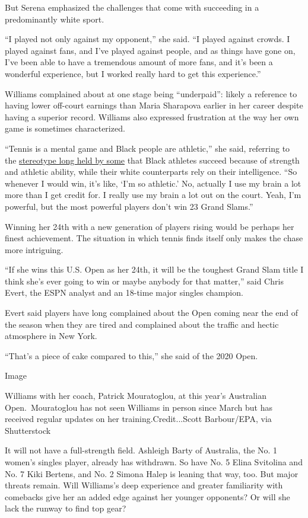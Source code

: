 But Serena emphasized the challenges that come with succeeding in a
predominantly white sport.

``I played not only against my opponent,'' she said. ``I played against
crowds. I played against fans, and I've played against people, and as
things have gone on, I've been able to have a tremendous amount of more
fans, and it's been a wonderful experience, but I worked really hard to
get this experience.''

Williams complained about at one stage being ``underpaid'': likely a
reference to having lower off-court earnings than Maria Sharapova
earlier in her career despite having a superior record. Williams also
expressed frustration at the way her own game is sometimes
characterized.

``Tennis is a mental game and Black people are athletic,'' she said,
referring to the
\href{https://www.nytimes.com/2020/06/30/sports/soccer/soccer-racism-broadcasting.html}{stereotype
long held by some} that Black athletes succeed because of strength and
athletic ability, while their white counterparts rely on their
intelligence. ``So whenever I would win, it's like, `I'm so athletic.'
No, actually I use my brain a lot more than I get credit for. I really
use my brain a lot out on the court. Yeah, I'm powerful, but the most
powerful players don't win 23 Grand Slams.''

Winning her 24th with a new generation of players rising would be
perhaps her finest achievement. The situation in which tennis finds
itself only makes the chase more intriguing.

``If she wins this U.S. Open as her 24th, it will be the toughest Grand
Slam title I think she's ever going to win or maybe anybody for that
matter,'' said Chris Evert, the ESPN analyst and an 18-time major
singles champion.

Evert said players have long complained about the Open coming near the
end of the season when they are tired and complained about the traffic
and hectic atmosphere in New York.

``That's a piece of cake compared to this,'' she said of the 2020 Open.

Image

Williams with her coach, Patrick Mouratoglou, at this year's Australian
Open.~Mouratoglou has not seen Williams in person since March but has
received regular updates on her training.Credit...Scott Barbour/EPA, via
Shutterstock

It will not have a full-strength field. Ashleigh Barty of Australia, the
No. 1 women's singles player, already has withdrawn. So have No. 5 Elina
Svitolina and No. 7 Kiki Bertens, and No. 2 Simona Halep is leaning that
way, too. But major threats remain. Will Williams's deep experience and
greater familiarity with comebacks give her an added edge against her
younger opponents? Or will she lack the runway to find top gear?

